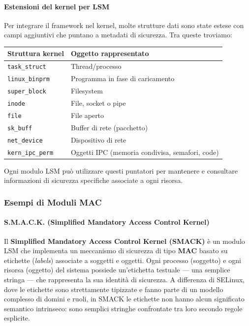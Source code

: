 \paragraph{Estensioni del kernel per LSM}
Per integrare il framework nel kernel, molte strutture dati sono state estese con campi aggiuntivi che puntano a metadati di sicurezza.
Tra queste troviamo:
\begin{center}
\begin{tabular}{ll}
\toprule
\textbf{Struttura kernel} & \textbf{Oggetto rappresentato} \\
\midrule
\texttt{task\_struct} & Thread/processo \\
\texttt{linux\_binprm} & Programma in fase di caricamento \\
\texttt{super\_block} & Filesystem \\
\texttt{inode} & File, socket o pipe \\
\texttt{file} & File aperto \\
\texttt{sk\_buff} & Buffer di rete (pacchetto) \\
\texttt{net\_device} & Dispositivo di rete \\
\texttt{kern\_ipc\_perm} & Oggetti IPC (memoria condivisa, semafori, code) \\
\bottomrule
\end{tabular}
\end{center}
Ogni modulo LSM può utilizzare questi puntatori per mantenere e consultare informazioni di sicurezza specifiche associate a ogni risorsa.


\subsubsection{Esempi di Moduli MAC}
\paragraph{S.M.A.C.K. (Simplified Mandatory Access Control Kernel)}
Il \textbf{Simplified Mandatory Access Control Kernel (SMACK)} è un modulo LSM che implementa un meccanismo di sicurezza di tipo \textbf{MAC} basato su etichette (\textit{labels}) associate a soggetti e oggetti.
Ogni processo (soggetto) e ogni risorsa (oggetto) del sistema possiede un’etichetta testuale — una semplice stringa — che rappresenta la sua identità di sicurezza.
A differenza di SELinux, dove le etichette sono strettamente tipizzate e fanno parte di un modello complesso di domini e ruoli, in SMACK le etichette non hanno alcun significato semantico intrinseco: sono semplici stringhe confrontate tra loro secondo regole esplicite.

